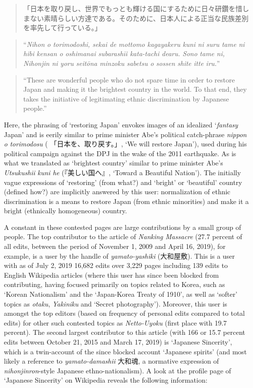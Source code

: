 \documentclass[10pt,british,A4paper,oneside]{memoir}
\begin{document}
\begin{quote}
「日本を取り戻し、世界でもっとも輝ける国にするために日々研鑽を惜しまない素晴らしい方達である。そのために、日本人による正当な民族差別を率先して行っている。」
\end{quote}

\begin{quote}
``\emph{Nihon o torimodoshi, sekai de mottomo kagayakeru kuni ni suru
tame ni hibi kensan o oshimanai subarashīi kata-tachi dearu. Sono tame
ni, Nihonjin ni yoru seitōna minzoku sabetsu o sossen shite itte iru.}''
\end{quote}

\begin{quote}
``These are wonderful people who do not spare time in order to restore
Japan and making it the brightest country in the world. To that end,
they takes the initiative of legitimating ethnic discrimination by
Japanese people.''
\end{quote}

Here, the phrasing of `restoring Japan' envokes images of an idealized
`\emph{fantasy} Japan' and is eerily similar to prime minister Abe's
political catch-phrase \emph{nippon o torimodosu} (
「日本を、取り戻す。」, `We will restore Japan'), used during his
political campaign against the DPJ in the wake of the 2011 earthquake.
As is what we translated as `brightest country' similar to prime
minister Abe's \emph{Utsukushii kuni he} (『美しい国へ』, `Toward a
Beautiful Nation'). The initially vague expressions of `restoring' (from
what?) and `bright' or `beautiful' country (defined how?) are implicitly
answered by this user: normalization of ethnic discrimination is a means
to restore Japan (from ethnic minorities) and make it a bright
(ethnically homogeneous) country.

A constant in these contested pages are large contributions by a small
group of people. The top contributor to the article of \emph{Nanking
Massacre} (27.7 percent of all edits, between the period of November 1,
2009 and April 16, 2019), for example, is a user by the handle of
\emph{yamato-yashiki} (大和屋敷). This is a user with as of July 2, 2019
16,682 edits over 3,229 pages including 139 edits to English Wikipedia
articles (where this user has since been blocked from contributing, having
focused primarily on topics related to Korea, such as `Korean
Nationalism' and the `Japan-Korea Treaty of 1910', as well as `softer'
topics as \emph{otaku}, \emph{Yakiniku} and `Secret photography').
Moreover, this user is amongst the top editors (based on frequency of
personal edits compared to total edits) for other such contested topics
as \emph{Netto-Uyoku} (first place with 19.7 percent). The second
largest contributor to this article (with 166 or 15.7 percent edits
between October 21, 2015 and March 17, 2019) is `Japanese Sincerity',
which is a twin-account of the since blocked account `Japanese spirits'
(and most likely a reference to \emph{yamato-damashii} 大和魂, a
normative expression of \emph{nihonjinron}-style Japanese
ethno-nationalism). A look at the profile page of `Japanese Sincerity'
on Wikipedia reveals the following information:
\end{document}
